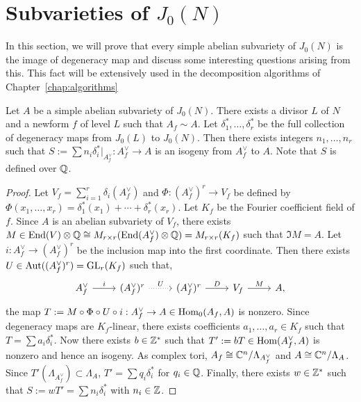 \section{Subvarieties of $J_0(N)$}%
\label{sec:subvarieties_of_j_0_n_}

In this section, we will prove that every simple abelian subvariety of $J_0(N)$
is the image of degeneracy map and discuss some interesting questions arising
from this. This fact will be extensively used in the decomposition algorithms
of Chapter~\ref{chap:algorithms}

\begin{proposition}
    \label{prop:integral_degen}
    Let $A$ be a simple abelian subvariety of $J_0(N)$. There exists a divisor
    $L$ of $N$ and a newform $f$ of level $L$ such that $A_f \sim A$. Let
    $\delta_1 ^*,\ldots,\delta_r ^*$ be the full collection of degeneracy maps
    from $J_0(L)$ to $J_0(N)$. Then there exists integers $n_1,\ldots,n_r$ such
    that $S:=\sum n_i \delta_i ^*|_{A_f ^\vee}: A_f^\vee\to A$ is an isogeny
    from $A_f^\vee$ to $A$. Note that $S$ is defined over $\mathbb{Q}$.
\end{proposition}
\begin{proof}
    Let $V_f=\sum_{i=1} ^r \delta_i(A_f ^\vee)$ and $\Phi:(A_f ^\vee)^r \to
    V_f$ be defined by $\Phi(x_1,\ldots,x_r) = \delta_1 ^*(x_1)+\cdots+\delta_r
    ^*(x_r)$. Let $K_f$ be the Fourier coefficient field of $f$. Since $A$ is
    an abelian subvariety of $V_f$, there exists $M\in \operatorname{End}(V)\otimes \mathbb{Q} \cong
    M_{r\times r}(\operatorname{End}(A_f ^\vee)\otimes\mathbb{Q}) = M_{r\times r} (K_f)$ such that
    $\Im M = A$. Let $i:A_f ^\vee\to (A_f ^\vee)^r$ be the inclusion map into
    the first coordinate. Then there exists $U\in \operatorname{Aut}((A_f ^\vee)^r)=\operatorname{GL}_r
    (K_f)$ such that,
    \[
        \begin{tikzcd}
            A_f ^\vee\arrow[r,"i"] &
            (A_f ^\vee)^r \arrow[r, dotted, "U"] &
            (A_f ^\vee) ^r \arrow[r, "D"] &
            V_f \arrow[r, "M"] &
            A,
        \end{tikzcd}
    \]
    the map $T:=M \circ \Phi \circ U\circ i:A_f ^\vee\to A\in \operatorname{Hom}_0(A_f, A)$
    is nonzero. Since degeneracy maps are $K_f$-linear, there exists
    coefficients $a_1,\ldots,a_r\in K_f$ such that $T = \sum a_i \delta_i ^*$.
    Now there exists $b\in \mathbb{Z}^*$ such that $T':=bT\in \operatorname{Hom}(A_f ^\vee, A)$ is
    nonzero and hence an isogeny. As complex tori, $A_f\cong \mathbb{C}^n/\Lambda_{A_f
    ^\vee}$ and $A\cong \mathbb{C}^n/\Lambda_A$. Since $T'(\Lambda_{A_f ^\vee})\subset
    \Lambda_A$, $T'=\sum q_i \delta_i ^*$ for $q_i\in \mathbb{Q}$. Finally, there
    exists $w\in \mathbb{Z}^*$ such that $S:=wT'=\sum n_i \delta_i ^*$ with $n_i\in \mathbb{Z}$.
\end{proof}

